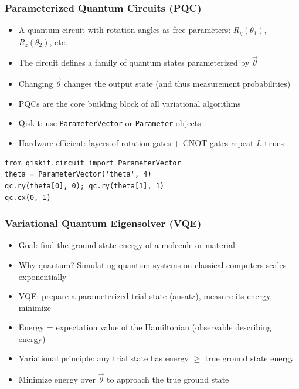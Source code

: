 \begin{frame}[fragile]\frametitle{Parameterized Quantum Circuits (PQC)}
\begin{itemize}
\item A quantum circuit with rotation angles as free parameters: $R_y(\theta_1)$, $R_z(\theta_2)$, etc.
\item The circuit defines a family of quantum states parameterized by $\vec{\theta}$
\item Changing $\vec{\theta}$ changes the output state (and thus measurement probabilities)
\item PQCs are the core building block of all variational algorithms
\item Qiskit: use \texttt{ParameterVector} or \texttt{Parameter} objects
\item Hardware efficient: layers of rotation gates + CNOT gates repeat $L$ times
\end{itemize}
\begin{verbatim}
from qiskit.circuit import ParameterVector
theta = ParameterVector('theta', 4)
qc.ry(theta[0], 0); qc.ry(theta[1], 1)
qc.cx(0, 1)
\end{verbatim}
\end{frame}

\begin{frame}[fragile]\frametitle{Variational Quantum Eigensolver (VQE)}
\begin{itemize}
\item Goal: find the ground state energy of a molecule or material
\item Why quantum? Simulating quantum systems on classical computers scales exponentially
\item VQE: prepare a parameterized trial state (ansatz), measure its energy, minimize
\item Energy = expectation value of the Hamiltonian (observable describing energy)
\item Variational principle: any trial state has energy $\geq$ true ground state energy
\item Minimize energy over $\vec{\theta}$ to approach the true ground state
\end{itemize}
\end{frame}


